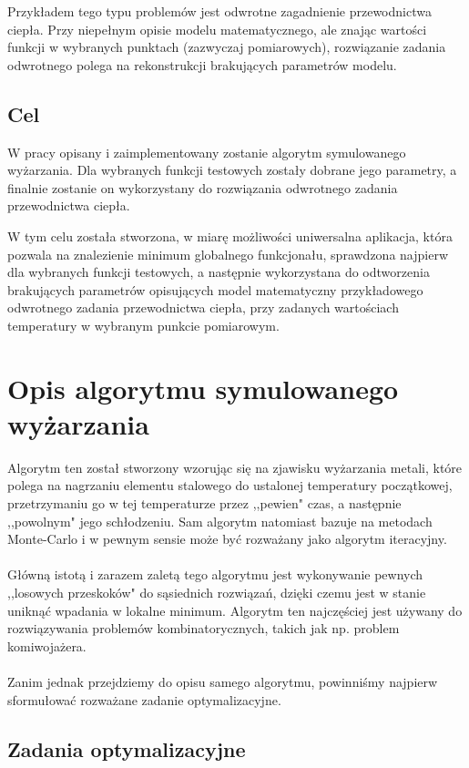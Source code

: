 \documentclass[twoside]{projektInzynierskiMS1}
\newcommand{\newLine}{~\\}
\newcommand{\si}{ś}
\begin{document}
Przykładem tego typu problemów jest odwrotne zagadnienie przewodnictwa ciepła. Przy niepełnym opisie modelu matematycznego, ale znając warto\si ci funkcji w wybranych punktach (zazwyczaj pomiarowych), rozwiązanie zadania odwrotnego polega na rekonstrukcji brakujących parametrów modelu. 

\subsection{Cel}

W pracy opisany i zaimplementowany zostanie algorytm symulowanego wyżarzania. Dla wybranych funkcji testowych zostały dobrane jego parametry, a finalnie zostanie on wykorzystany do rozwiązania odwrotnego zadania przewodnictwa ciepła.

W tym celu została stworzona, w miarę możliwo\si ci uniwersalna aplikacja, która pozwala na znalezienie minimum globalnego funkcjonału, sprawdzona najpierw dla wybranych funkcji testowych, a następnie wykorzystana do odtworzenia brakujących parametrów opisujących model matematyczny przykładowego odwrotnego zadania przewodnictwa ciepła, przy zadanych warto\si ciach temperatury w wybranym punkcie pomiarowym.


\section{Opis algorytmu symulowanego wyżarzania}
				Algorytm ten został stworzony wzorując się na zjawisku wyżarzania metali, które polega na nagrzaniu elementu stalowego do ustalonej temperatury początkowej, przetrzymaniu go w tej temperaturze przez ,,pewien" czas, a następnie ,,powolnym" jego schłodzeniu. Sam algorytm natomiast bazuje na metodach Monte-Carlo i w pewnym sensie może być rozważany jako algorytm iteracyjny.\\ \newLine
Główną istotą i zarazem zaletą tego algorytmu jest wykonywanie pewnych ,,losowych przeskoków" do sąsiednich rozwiązań, dzięki czemu jest w stanie uniknąć wpadania w lokalne minimum. Algorytm ten najczę\si ciej jest używany do rozwiązywania problemów kombinatorycznych, takich jak np. problem komiwojażera. \\ \newLine
Zanim jednak przejdziemy do opisu samego algorytmu, powinni\si my najpierw sformułować rozważane zadanie optymalizacyjne.

\subsection{Zadania optymalizacyjne}
\end{document}
